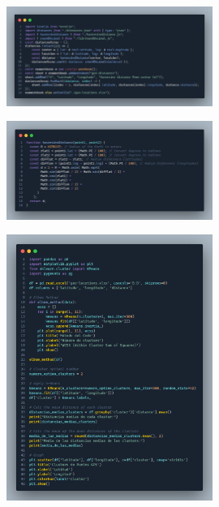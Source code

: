 \label{apendix:script-exceljs}
\begin{figure}[H]
    \centering
    \includegraphics[width=0.6\textwidth]{chapters/appendices/code/script-exceljs.png}
\end{figure}


\label{apendix:script-haversine}
\begin{figure}[H]
    \centering
    \includegraphics[width=0.6\textwidth]{chapters/appendices/code/script-haversine.png}
\end{figure}


\label{apendix:script-cluster-python}
\begin{figure}[H]
    \centering
    \includegraphics[width=0.6\textwidth]{chapters/appendices/code/script-cluster-python.png}
\end{figure}


